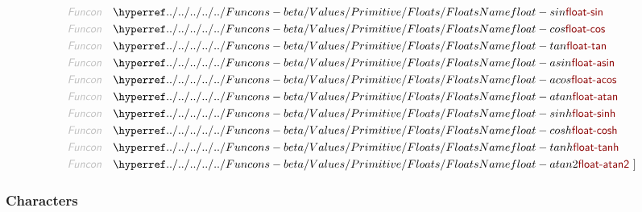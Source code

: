 \begin{align*}
  \KEY{Funcon} \quad & \NAMEHYPER{../../../../../Funcons-beta/Values/Primitive}{Floats}{float-sin} \\
  \KEY{Funcon} \quad & \NAMEHYPER{../../../../../Funcons-beta/Values/Primitive}{Floats}{float-cos} \\
  \KEY{Funcon} \quad & \NAMEHYPER{../../../../../Funcons-beta/Values/Primitive}{Floats}{float-tan} \\
  \KEY{Funcon} \quad & \NAMEHYPER{../../../../../Funcons-beta/Values/Primitive}{Floats}{float-asin} \\
  \KEY{Funcon} \quad & \NAMEHYPER{../../../../../Funcons-beta/Values/Primitive}{Floats}{float-acos} \\
  \KEY{Funcon} \quad & \NAMEHYPER{../../../../../Funcons-beta/Values/Primitive}{Floats}{float-atan} \\
  \KEY{Funcon} \quad & \NAMEHYPER{../../../../../Funcons-beta/Values/Primitive}{Floats}{float-sinh} \\
  \KEY{Funcon} \quad & \NAMEHYPER{../../../../../Funcons-beta/Values/Primitive}{Floats}{float-cosh} \\
  \KEY{Funcon} \quad & \NAMEHYPER{../../../../../Funcons-beta/Values/Primitive}{Floats}{float-tanh} \\
  \KEY{Funcon} \quad & \NAMEHYPER{../../../../../Funcons-beta/Values/Primitive}{Floats}{float-atan2}
  \ ]
\end{align*}
\subsubsection{Characters}\hypertarget{characters}{}\label{characters}

